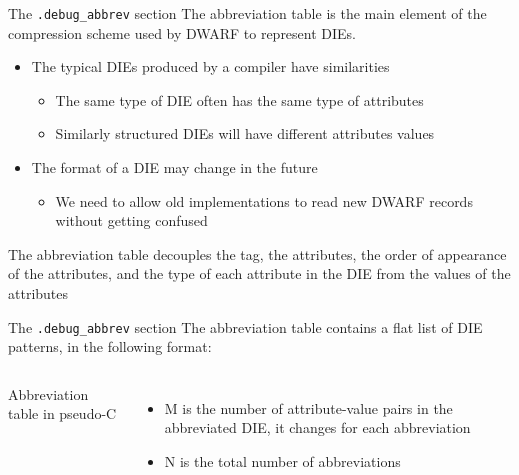 \begin{frame}{The \texttt{.debug\_abbrev} section}
The \alert{abbreviation table} is the main element of the \alert{compression scheme}
used by DWARF to represent DIEs.\\
\medskip
\begin{itemize}
\item The typical DIEs produced by a compiler have similarities
	\begin{itemize}
	\item The same type of DIE often has the same type of attributes
	\item Similarly structured DIEs will have different attributes values
	\end{itemize}
\item The format of a DIE may change in the future
	\begin{itemize}
	\item We need to allow old implementations to read new DWARF records without
		getting confused
	\end{itemize}
\end{itemize}
\medskip
The abbreviation table \alert{decouples the tag, the attributes, the order of
appearance of the attributes, and the type of each attribute in the DIE
from the values of the attributes}
\end{frame}


\begin{frame}{The \texttt{.debug\_abbrev} section}
The abbreviation table contains a flat list of DIE patterns, in the following format:

\begin{columns}[onlytextwidth]

\begin{block}{Abbreviation table in pseudo-C}
\end{block}

\begin{itemize}
\item M is the number of attribute-value pairs in the abbreviated DIE,
	it changes for each abbreviation
\item N is the total number of abbreviations
\end{itemize}

\end{columns}

\end{frame}



